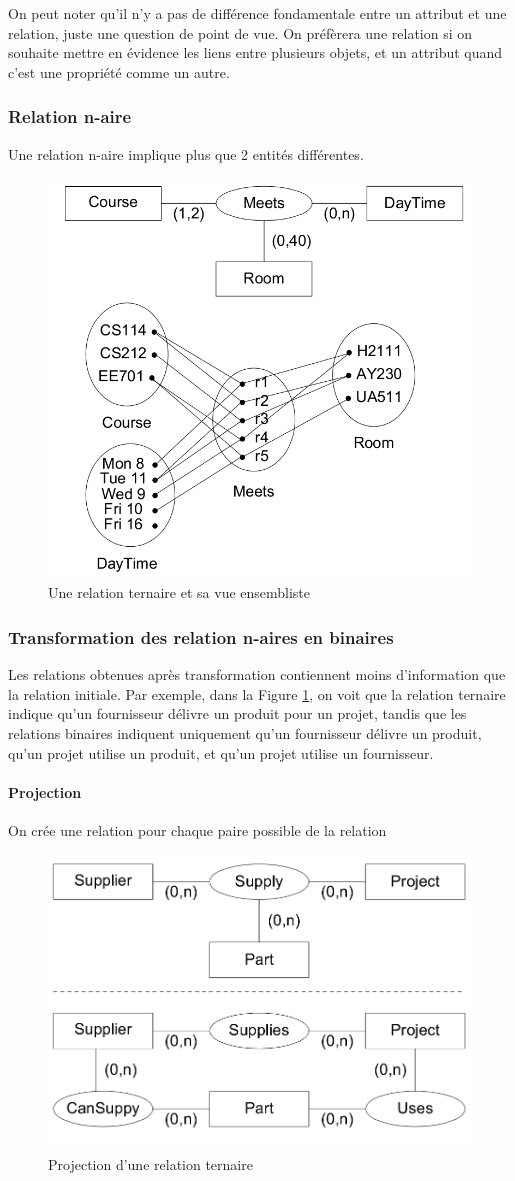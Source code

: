 \documentclass[a4paper]{article}
\begin{document}
On peut noter qu'il n'y a pas de différence fondamentale entre un attribut et une relation,
juste une question de point de vue. On préfèrera une relation si on souhaite mettre en évidence
les liens entre plusieurs objets, et un attribut quand c'est une propriété comme un autre.

\subsubsection{Relation n-aire}
Une relation n-aire implique plus que 2 entités différentes.

\begin{figure}[h!]
    \center
    \includegraphics[width=.4\textwidth]{fig/relation-naire.png}
    \caption{Une relation ternaire et sa vue ensembliste}
\end{figure}

\subsubsection{Transformation des relation n-aires en binaires}
Les relations obtenues après transformation contiennent moins d'information
que la relation initiale. Par exemple, dans la Figure \ref{fig:relation-naire-projection},
on voit que la relation ternaire indique qu'un fournisseur délivre un produit pour un projet,
tandis que les relations binaires indiquent uniquement qu'un fournisseur délivre un produit,
qu'un projet utilise un produit, et qu'un projet utilise un fournisseur.

\paragraph{Projection}
On crée une relation pour chaque paire possible de la relation
\begin{figure}[h!]
    \center
    \includegraphics[width=.4\textwidth]{fig/relation-naire-projection.png}
    \caption{\label{fig:relation-naire-projection}Projection d'une relation ternaire}
\end{figure}
\end{document}
